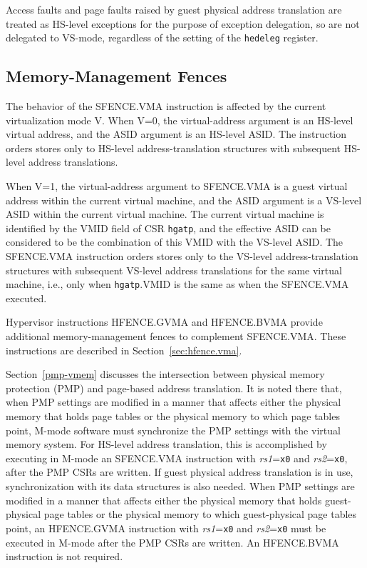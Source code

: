 Access faults and page faults raised by guest physical address translation are
treated as HS-level exceptions for the purpose of exception delegation, so are
not delegated to VS-mode, regardless of the setting of the {\tt hedeleg}
register.

\subsection{Memory-Management Fences}

The behavior of the SFENCE.VMA instruction is affected by the current
virtualization mode V.  When V=0, the virtual-address argument is an HS-level
virtual address, and the ASID argument is an HS-level ASID.
The instruction orders stores only to HS-level address-translation structures
with subsequent HS-level address translations.

When V=1, the virtual-address argument to SFENCE.VMA is a guest virtual
address within the current virtual machine, and the ASID argument is a VS-level
ASID within the current virtual machine.
The current virtual machine is identified by the VMID field of CSR {\tt hgatp},
and the effective ASID can be considered to be the combination of this VMID
with the VS-level ASID.
The SFENCE.VMA instruction orders stores only to the VS-level
address-translation structures with subsequent VS-level address translations
for the same virtual machine, i.e., only when {\tt hgatp}.VMID is the same as
when the SFENCE.VMA executed.

Hypervisor instructions HFENCE.GVMA and HFENCE.BVMA provide additional
memory-management fences to complement SFENCE.VMA.
These instructions are described in Section~\ref{sec:hfence.vma}.

Section~\ref{pmp-vmem} discusses the intersection between physical memory
protection (PMP) and page-based address translation.
It is noted there that, when PMP settings are modified in a manner that affects
either the physical memory that holds page tables or the physical memory to
which page tables point, M-mode software must synchronize the PMP settings with
the virtual memory system.
For HS-level address translation, this is accomplished by executing in M-mode
an SFENCE.VMA instruction with {\em rs1}={\tt x0} and {\em rs2}={\tt x0}, after
the PMP CSRs are written.
If guest physical address translation is in use, synchronization with its data
structures is also needed.
When PMP settings are modified in a manner that affects either the physical
memory that holds guest-physical page tables or the physical memory to which
guest-physical page tables point, an HFENCE.GVMA instruction with
{\em rs1}={\tt x0} and {\em rs2}={\tt x0} must be executed in M-mode after the
PMP CSRs are written.
An HFENCE.BVMA instruction is not required.


